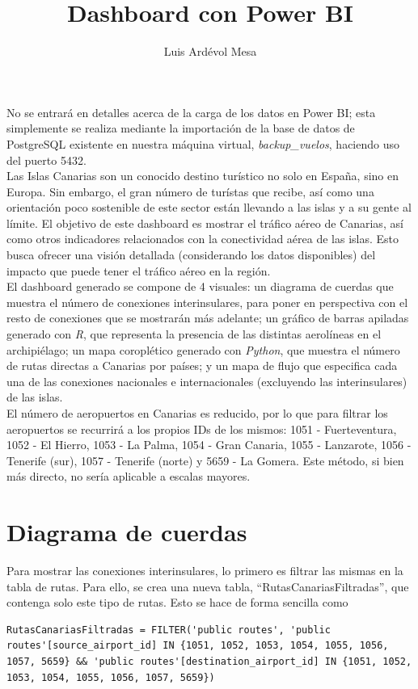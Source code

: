 \documentclass[11pt]{opticajnl}
\title{Dashboard con Power BI}
\author[1,2,3]{Luis Ardévol Mesa}
\begin{document}
\maketitle

No se entrará en detalles acerca de la carga de los datos en Power BI; esta simplemente se realiza mediante la importación de la base de datos de PostgreSQL existente en nuestra máquina virtual, \textit{backup\_vuelos}, haciendo uso del puerto 5432. \\

Las Islas Canarias son un conocido destino turístico no solo en España, sino en Europa. Sin embargo, el gran número de turístas que recibe, así como una orientación poco sostenible de este sector están llevando a las islas y a su gente al límite. El objetivo de este dashboard es mostrar el tráfico aéreo de Canarias, así como otros indicadores relacionados con la conectividad aérea de las islas. Esto busca ofrecer una visión detallada (considerando los datos disponibles) del impacto que puede tener el tráfico aéreo en la región. \\ 

El dashboard generado se compone de 4 visuales: un diagrama de cuerdas que muestra el número de conexiones interinsulares, para poner en perspectiva con el resto de conexiones que se mostrarán más adelante; un gráfico de barras apiladas generado con \textit{R}, que representa la presencia de las distintas aerolíneas en el archipiélago; un mapa coroplético generado con \textit{Python}, que muestra el número de rutas directas a Canarias por países; y un mapa de flujo que especifica cada una de las conexiones nacionales e internacionales (excluyendo las interinsulares) de las islas. \\

El número de aeropuertos en Canarias es reducido, por lo que para filtrar los aeropuertos se recurrirá a los propios IDs de los mismos: 1051 - Fuerteventura, 1052 - El Hierro, 1053 - La Palma, 1054 - Gran Canaria, 1055 - Lanzarote, 1056 - Tenerife (sur), 1057 - Tenerife (norte) y 5659 - La Gomera. Este método, si bien más directo, no sería aplicable a escalas mayores. \\

\section{Diagrama de cuerdas}

Para mostrar las conexiones interinsulares, lo primero es filtrar las mismas en la tabla de rutas. Para ello, se crea una nueva tabla, ``RutasCanariasFiltradas'', que contenga solo este tipo de rutas. Esto se hace de forma sencilla como 
\begin{lstlisting}[style=terminal]
RutasCanariasFiltradas = FILTER('public routes', 'public routes'[source_airport_id] IN {1051, 1052, 1053, 1054, 1055, 1056, 1057, 5659} && 'public routes'[destination_airport_id] IN {1051, 1052, 1053, 1054, 1055, 1056, 1057, 5659})
\end{lstlisting}
\end{document}
